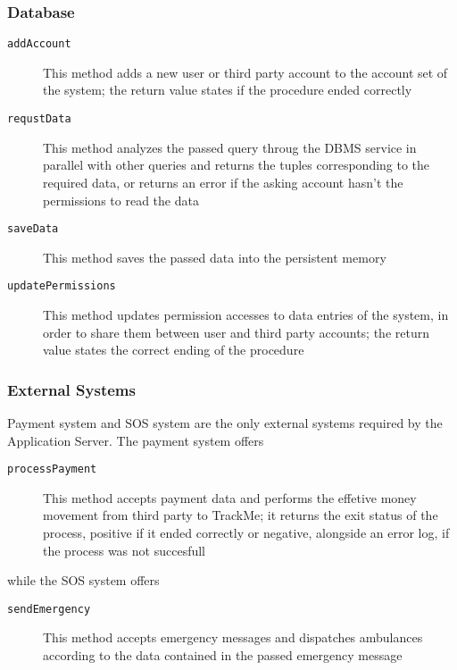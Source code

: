 \documentclass[../DD0.tex]{subfiles}
\begin{document}
    \subsubsection{Database}

      \begin{description}
        \item[\texttt{addAccount}] This method adds a new user or third party account to the account set of the system; the return value states if the procedure ended correctly

        \item[\texttt{requstData}] This method analyzes the passed query throug the DBMS service in parallel with other queries and returns the tuples corresponding to the required data, or returns an error if the asking account hasn't the permissions to read the data

        \item[\texttt{saveData}] This method saves the passed data into the persistent memory

        \item[\texttt{updatePermissions}] This method updates permission accesses to data entries of the system, in order to share them between user and third party accounts; the return value states the correct ending of the procedure
      \end{description}

    \subsubsection{External Systems}

      Payment system and SOS system are the only external systems required by the Application Server. The payment system offers
      \begin{description}
        \item[\texttt{processPayment}] This method accepts payment data and performs the effetive money movement from third party to TrackMe; it returns the exit status of the process, positive if it ended correctly or negative, alongside an error log, if the process was not succesfull
      \end{description}
      while the SOS system offers
      \begin{description}
        \item[\texttt{sendEmergency}] This method accepts emergency messages and dispatches ambulances according to the data contained in the passed emergency message
      \end{description}
\end{document}
